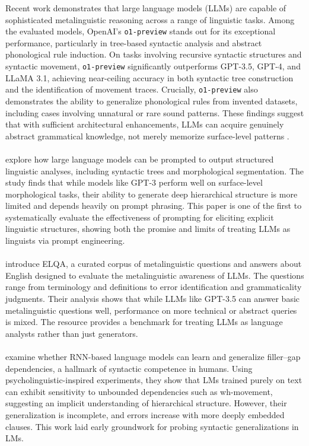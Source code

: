 Recent work demonstrates that large language models (LLMs) are capable of sophisticated metalinguistic reasoning across a range of linguistic tasks. Among the evaluated models, OpenAI's \texttt{o1-preview} stands out for its exceptional performance, particularly in tree-based syntactic analysis and abstract phonological rule induction. On tasks involving recursive syntactic structures and syntactic movement, \texttt{o1-preview} significantly outperforms GPT-3.5, GPT-4, and LLaMA 3.1, achieving near-ceiling accuracy in both syntactic tree construction and the identification of movement traces. Crucially, \texttt{o1-preview} also demonstrates the ability to generalize phonological rules from invented datasets, including cases involving unnatural or rare sound patterns. These findings suggest that with sufficient architectural enhancements, LLMs can acquire genuinely abstract grammatical knowledge, not merely memorize surface-level patterns \citep{begus2025}.

\paragraph{} \citet{blevins2023prompting} explore how large language models can be prompted to output structured linguistic analyses, including syntactic trees and morphological segmentation. The study finds that while models like GPT-3 perform well on surface-level morphological tasks, their ability to generate deep hierarchical structure is more limited and depends heavily on prompt phrasing. This paper is one of the first to systematically evaluate the effectiveness of prompting for eliciting explicit linguistic structures, showing both the promise and limits of treating LLMs as linguists via prompt engineering.

\paragraph{} \citet{behzad2023elqa} introduce ELQA, a curated corpus of metalinguistic questions and answers about English designed to evaluate the metalinguistic awareness of LLMs. The questions range from terminology and definitions to error identification and grammaticality judgments. Their analysis shows that while LLMs like GPT-3.5 can answer basic metalinguistic questions well, performance on more technical or abstract queries is mixed. The resource provides a benchmark for treating LLMs as language analysts rather than just generators.

\paragraph{} \citet{wilcox2018filler} examine whether RNN-based language models can learn and generalize filler--gap dependencies, a hallmark of syntactic competence in humans. Using psycholinguistic-inspired experiments, they show that LMs trained purely on text can exhibit sensitivity to unbounded dependencies such as wh-movement, suggesting an implicit understanding of hierarchical structure. However, their generalization is incomplete, and errors increase with more deeply embedded clauses. This work laid early groundwork for probing syntactic generalizations in LMs.

